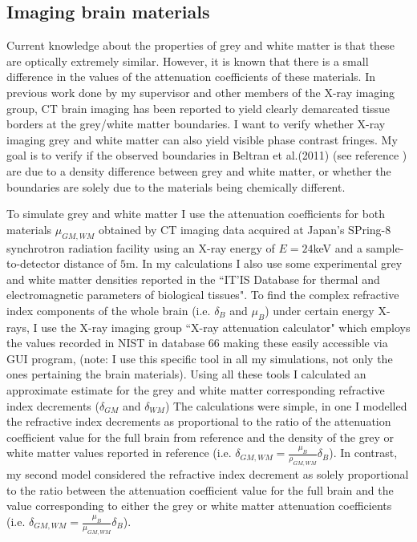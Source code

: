 \documentclass[9pt, a4paper]{article}
\begin{document}
\subsection{Imaging brain materials}
Current knowledge about the properties of grey and white matter is that these are optically extremely similar. However, it is known that there is a small difference in the values of the attenuation coefficients of these materials. In previous work done by my supervisor and other members of the X-ray imaging group, CT brain imaging has been reported to yield clearly demarcated tissue borders at the grey/white matter boundaries\cite{Beltran2}. I want to verify whether X-ray imaging grey and white matter can also yield visible phase contrast fringes. My goal is to verify if the observed boundaries in Beltran et al.(2011) (see reference \cite{Beltran2}) are due to a density difference between grey and white matter, or whether the boundaries are solely due to the materials being chemically different.

To simulate grey and white matter I use the attenuation coefficients for both materials $\mu_{GM,WM}$ obtained by CT imaging data acquired at Japan's SPring-8 synchrotron radiation facility using an X-ray energy of $E = 24$keV and a sample-to-detector distance of $5$m\cite{Linda}. In my calculations I also use some experimental grey and white matter densities reported in the ``IT’IS Database for thermal and electromagnetic parameters of biological tissues". To find the complex refractive index components of the whole brain (i.e. $\delta_B$ and $\mu_B$) under certain energy X-rays, I use the X-ray imaging group ``X-ray attenuation calculator" which employs the values recorded in NIST in database 66\cite{NIST} making these easily accessible via GUI program, (note: I use this specific tool in all my simulations, not only the ones pertaining the brain materials). 
Using all these tools I calculated an approximate estimate for the grey and white matter corresponding refractive index decrements ($\delta_{GM}$ and $\delta_{WM}$) The calculations were simple, in one I modelled the refractive index decrements as proportional to the ratio of the attenuation coefficient value for the full brain from reference\cite{NIST} and the density of the grey or white matter values reported in reference \cite{ITIS} (i.e. $\delta_{GM,WM} = \frac{\mu_B}{\rho_{GM,WM}} \delta_B$). In contrast, my second model considered the refractive index decrement as solely proportional to the ratio between the attenuation coefficient value for the full brain and the value corresponding to either the grey or white matter attenuation coefficients (i.e. $\delta_{GM,WM} = \frac{\mu_B}{\mu_{GM,WM}} \delta_B$). 
\end{document}
